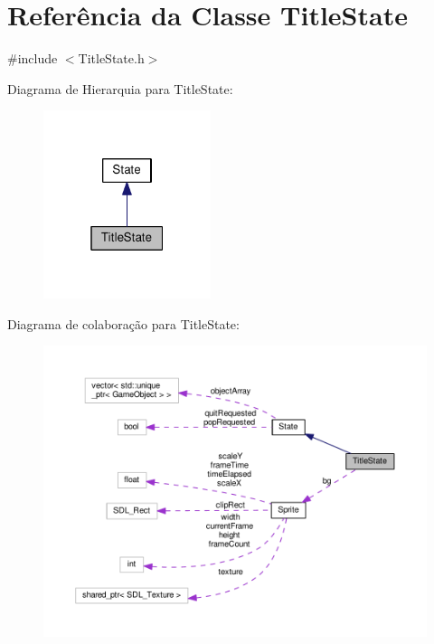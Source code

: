 \hypertarget{classTitleState}{\section{Referência da Classe Title\+State}
\label{classTitleState}
}


{\ttfamily \#include $<$Title\+State.\+h$>$}



Diagrama de Hierarquia para Title\+State\+:\nopagebreak
\begin{figure}[H]
\begin{center}
\leavevmode
\includegraphics[width=139pt]{classTitleState__inherit__graph}
\end{center}
\end{figure}


Diagrama de colaboração para Title\+State\+:
\nopagebreak
\begin{figure}[H]
\begin{center}
\leavevmode
\includegraphics[width=350pt]{classTitleState__coll__graph}
\end{center}
\end{figure}
